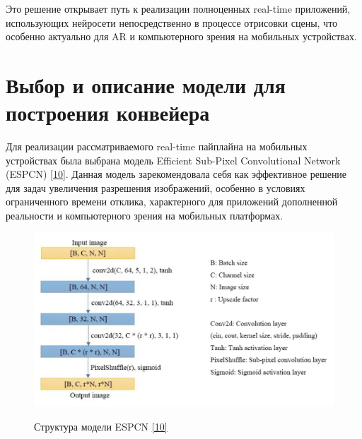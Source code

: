 \documentclass[a4paper,14pt]{extreport}
\begin{document}
            Это решение открывает путь к реализации полноценных real-time приложений, использующих нейросети непосредственно в процессе отрисовки сцены, что особенно актуально для AR и компьютерного зрения на мобильных устройствах.

        \section{Выбор и описание модели для построения конвейера}
        Для реализации рассматриваемого real-time пайплайна на мобильных устройствах была выбрана модель Efficient Sub-Pixel Convolutional Network (ESPCN) \hyperlink{[10]}{[10]}. Данная модель зарекомендовала себя как эффективное решение для задач увеличения разрешения изображений, особенно в условиях ограниченного времени отклика, характерного для приложений дополненной реальности и компьютерного зрения на мобильных платформах.

        \begin{figure}[!h]
            \begin{center}
                \begin{minipage}[!h]{\linewidth}
                    \includegraphics[width=1\linewidth]{images-pipeline/model.png}
                    \label{ris:netron}
                    \caption{Структура модели ESPCN \hyperlink{[10]}{[10]}}
                \end{minipage}
            \end{center}
        \end{figure}
        
\end{document}
